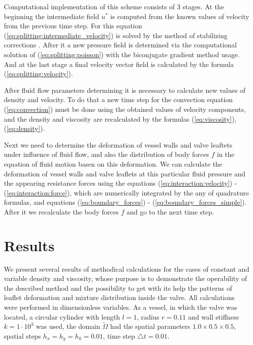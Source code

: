 \documentclass[runningheads,a4paper]{llncs}
\begin{document}
Computational implementation of this scheme consists of 3 stages. At the beginning the intermediate field $u^*$  is computed from the known values of velocity
from the previous time step. For this equation (\ref{eq:splitting:intermediate_velocity}) is solved by the method of stabilizing corrections \cite{yanenko}.
After it a new pressure field is determined via the computational solution of (\ref{eq:splitting:poisson}) with the biconjugate gradient method usage.
And at the last stage a final velocity vector field is calculated by the formula (\ref{eq:splitting:velocity}).

After fluid flow parameters determining it is necessary to calculate new values of density and velocity. To do that a new time step for the convection
equation (\ref{eq:convection}) must be done using the obtained values of velocity components, and the density and viscosity are recalculated
by the formulas (\ref{eq:viscosity}), (\ref{eq:density}).

Next we need to determine the deformation of vessel walls and valve leaftets under influence of fluid flow, and also the distribution of body forces $f$
in the equation of fluid motion basen on this deformation. We can calculate the deformation of vessel walls and valve leaflets at this particular fluid pressure
and the appearing resistance forces using the equations (\ref{eq:interaction:velocity}) - (\ref{eq:interaction:force}), which are numerically integrated by
the any of quadrature formulas, and equations (\ref{eq:boundary_forces}) - (\ref{eq:boundary_forces_simple}). After it we recalculate the body forces $f$
and go to the next time step.

\section{Results}

We present several results of methodical calculations for the cases of constant and variable density and viscosity, whose purpose is to demonstrate the operability
of the described method and the possibility to get with its help the patterns of  leaflet deformation and mixture distribution inside the valve.
All calculations were performed in dimensionless variables. As a vessel, in which the valve was located, a circular cylinder with length $l = 1$,
radius $r = 0.11$ and wall stiffness $k = 1 \cdot 10^3$ was used, the domain $\tilde{\Omega}$ had the spatial parameters $1.0 \times 0.5 \times 0.5$,
spatial steps $h_x = h_y = h_k = 0.01$, time step $\triangle t = 0.01$.
\end{document}

